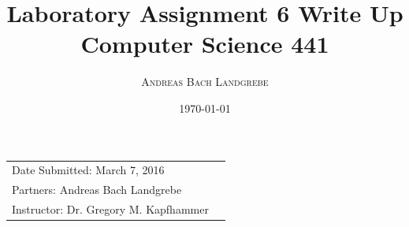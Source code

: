 \documentclass{article}
\title{Laboratory Assignment 6 Write Up \\ Computer Science 441} %
\author{\textsc{Andreas Bach Landgrebe}} %
\date{\today} %
\begin{document}
\maketitle %

\begin{center}
\begin{tabular}{l r}
Date Submitted:  March 7, 2016 \\ %
Partners:  Andreas Bach Landgrebe  \\ %
Instructor:  Dr. Gregory M. Kapfhammer  %
\end{tabular}
\end{center}


\end{document}
